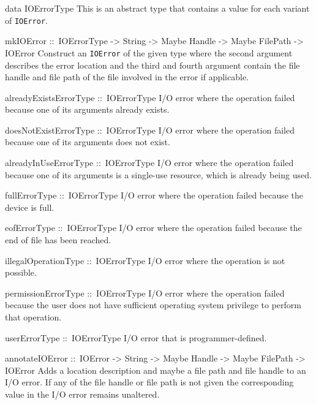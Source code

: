 \documentclass[a4paper,twoside]{article}
\makeatletter
\newcommand{\code}[1]{\texttt{#1}}      %
\newenvironment{codedesc}{%
  \list{}{\labelwidth\z@
    \let\makelabel\codedesclabel}
  }{%
  \endlist
  }
\newcommand*{\codedesclabel}[1]{%
  \hspace{-\leftmargin}
  \parbox[b]{\labelwidth}{\makebox[0pt][l]{\code{#1}}\\}\hfil\relax
  }
\makeatother
\begin{document}
\begin{codedesc}
\item[data IOErrorType] This is an abstract type that contains a value for
  each variant of \code{IOError}.

\item[mkIOError ::\ IOErrorType -> String -> Maybe Handle -> Maybe FilePath
  -> IOError] Construct an \code{IOError} of the given type where the second
  argument describes the error location and the third and fourth argument
  contain the file handle and file path of the file involved in the error if
  applicable. 
  
\item[alreadyExistsErrorType ::\ IOErrorType] I/O error where the operation
  failed because one of its arguments already exists.
  
\item[doesNotExistErrorType ::\ IOErrorType] I/O error where the operation
  failed because one of its arguments does not exist.
  
\item[alreadyInUseErrorType ::\ IOErrorType] I/O error where the operation
  failed because one of its arguments is a single-use resource, which is
  already being used.
  
\item[fullErrorType ::\ IOErrorType] I/O error where the operation failed
  because the device is full.
  
\item[eofErrorType ::\ IOErrorType] I/O error where the operation failed
  because the end of file has been reached.
  
\item[illegalOperationType ::\ IOErrorType] I/O error where the operation is
  not possible.
  
\item[permissionErrorType ::\ IOErrorType] I/O error where the operation failed
  because the user does not have sufficient operating system privilege to
  perform that operation.

\item[userErrorType ::\ IOErrorType] I/O error that is programmer-defined.

\item[annotateIOError ::\ IOError -> String -> Maybe Handle -> Maybe
  FilePath -> IOError] Adds a location description and maybe a file path and
  file handle to an I/O error.  If any of the file handle or file path is not
  given the corresponding value in the I/O error remains unaltered.
\end{codedesc}
\end{document}
